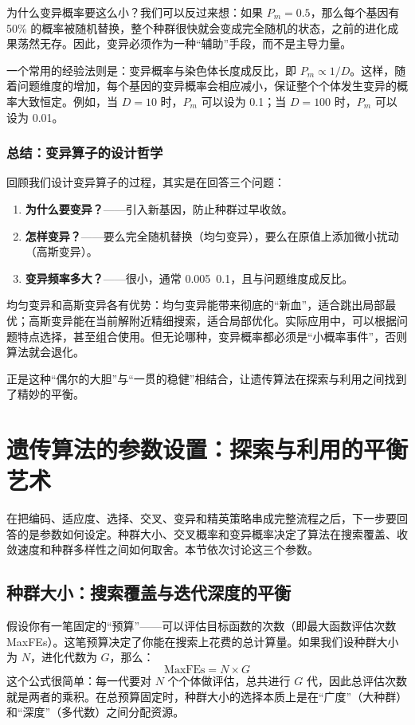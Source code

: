 \documentclass[lang=cn,zihao=-4,a4paper,fontset=windows]{beautybook}
\begin{document}
为什么变异概率要这么小？我们可以反过来想：如果 $P_m=0.5$，那么每个基因有 50\% 的概率被随机替换，整个种群很快就会变成完全随机的状态，之前的进化成果荡然无存。因此，变异必须作为一种“辅助”手段，而不是主导力量。

一个常用的经验法则是：变异概率与染色体长度成反比，即 $P_m \propto 1/D$。这样，随着问题维度的增加，每个基因的变异概率会相应减小，保证整个个体发生变异的概率大致恒定。例如，当 $D=10$ 时，$P_m$ 可以设为 0.1；当 $D=100$ 时，$P_m$ 可以设为 0.01。

\subsubsection{总结：变异算子的设计哲学}

回顾我们设计变异算子的过程，其实是在回答三个问题：
\begin{enumerate}
    \item \textbf{为什么要变异？}——引入新基因，防止种群过早收敛。
    \item \textbf{怎样变异？}——要么完全随机替换（均匀变异），要么在原值上添加微小扰动（高斯变异）。
    \item \textbf{变异频率多大？}——很小，通常 0.005~0.1，且与问题维度成反比。
\end{enumerate}

均匀变异和高斯变异各有优势：均匀变异能带来彻底的“新血”，适合跳出局部最优；高斯变异能在当前解附近精细搜索，适合局部优化。实际应用中，可以根据问题特点选择，甚至组合使用。但无论哪种，变异概率都必须是“小概率事件”，否则算法就会退化。

正是这种“偶尔的大胆”与“一贯的稳健”相结合，让遗传算法在探索与利用之间找到了精妙的平衡。

\section{遗传算法的参数设置：探索与利用的平衡艺术}

在把编码、适应度、选择、交叉、变异和精英策略串成完整流程之后，下一步要回答的是参数如何设定。种群大小、交叉概率和变异概率决定了算法在搜索覆盖、收敛速度和种群多样性之间如何取舍。本节依次讨论这三个参数。

\subsection{种群大小：搜索覆盖与迭代深度的平衡}

假设你有一笔固定的“预算”——可以评估目标函数的次数（即最大函数评估次数 MaxFEs）。这笔预算决定了你能在搜索上花费的总计算量。如果我们设种群大小为 $N$，进化代数为 $G$，那么：
\[
\text{MaxFEs} = N \times G
\]
这个公式很简单：每一代要对 $N$ 个个体做评估，总共进行 $G$ 代，因此总评估次数就是两者的乘积。在总预算固定时，种群大小的选择本质上是在“广度”（大种群）和“深度”（多代数）之间分配资源。
\end{document}
